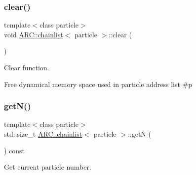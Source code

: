 \subsubsection{\texorpdfstring{clear()}{clear()}}
{\footnotesize\ttfamily template$<$class particle$>$ \\
void \hyperlink{classARC_1_1chainlist}{A\+R\+C\+::chainlist}$<$ particle $>$\+::clear (\begin{DoxyParamCaption}{ }\end{DoxyParamCaption})\hspace{0.3cm}{\ttfamily [inline]}}



Clear function. 

Free dynamical memory space used in particle address list \#p \hypertarget{classARC_1_1chainlist_a9b45780f42626b14e3a2fd7b5de4bf32}{}\label{classARC_1_1chainlist_a9b45780f42626b14e3a2fd7b5de4bf32} 
\subsubsection{\texorpdfstring{get\+N()}{getN()}}
{\footnotesize\ttfamily template$<$class particle$>$ \\
std\+::size\+\_\+t \hyperlink{classARC_1_1chainlist}{A\+R\+C\+::chainlist}$<$ particle $>$\+::getN (\begin{DoxyParamCaption}{ }\end{DoxyParamCaption}) const\hspace{0.3cm}{\ttfamily [inline]}}



Get current particle number. 

